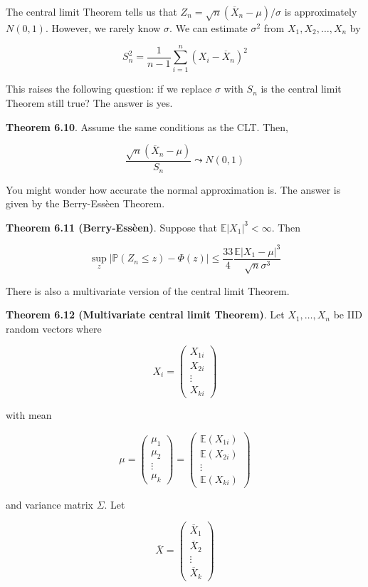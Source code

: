 The central limit Theorem tells us that
\(Z_{n} = \sqrt{n}(\overline{X}_{n} - \mu)/\sigma\) is approximately
\(N(0, 1)\). However, we rarely know \(\sigma\). We can estimate
\(\sigma^{2}\) from \(X_{1}, X_{2}, \dots, X_{n}\) by

\[ S_{n}^{2} = \frac{1}{n - 1} \sum_{i=1}^{n} ( X_{i} - \overline{X}_{n} )^{2} \]

This raises the following question: if we replace \(\sigma\) with
\(S_{n}\) is the central limit Theorem still true? The answer is yes.

\textbf{Theorem 6.10}. Assume the same conditions as the CLT. Then,

\[ \frac{\sqrt{n} \left(\overline{X}_{n} - \mu \right)}{S_{n}} \leadsto N(0, 1)\]

You might wonder how accurate the normal approximation is. The answer is
given by the Berry-Essèen Theorem.

\textbf{Theorem 6.11 (Berry-Essèen)}. Suppose that
\(\mathbb{E}|X_{1}|^{3} < \infty\). Then

\[ \sup _z |\mathbb{P}(Z_{n} \leq z) - \Phi(z)| \leq \frac{33}{4} \frac{\mathbb{E}|X_{1} - \mu|^{3}}{\sqrt{n}\sigma^{3}} \]

There is also a multivariate version of the central limit Theorem.

\textbf{Theorem 6.12 (Multivariate central limit Theorem)}. Let
\(X_{1}, \dots, X_{n}\) be IID random vectors where

\[ X_{i} = \begin{pmatrix} X_{1i} \\ X_{2i} \\ \vdots \\ X_{ki} \end{pmatrix}\]

with mean

\[ \mu 
= \begin{pmatrix} \mu_{1} \\ \mu_{2} \\ \vdots \\ \mu_{k} \end{pmatrix} 
= \begin{pmatrix} \mathbb{E}(X_{1i}) \\ \mathbb{E}(X_{2i}) \\ \vdots \\ \mathbb{E}(X_{ki}) \end{pmatrix} \]

and variance matrix \(\Sigma\). Let

\[ \overline{X} = \begin{pmatrix} \overline{X}_{1} \\ \overline{X}_{2} \\ \vdots \\ \overline{X}_{k} \end{pmatrix}\]

